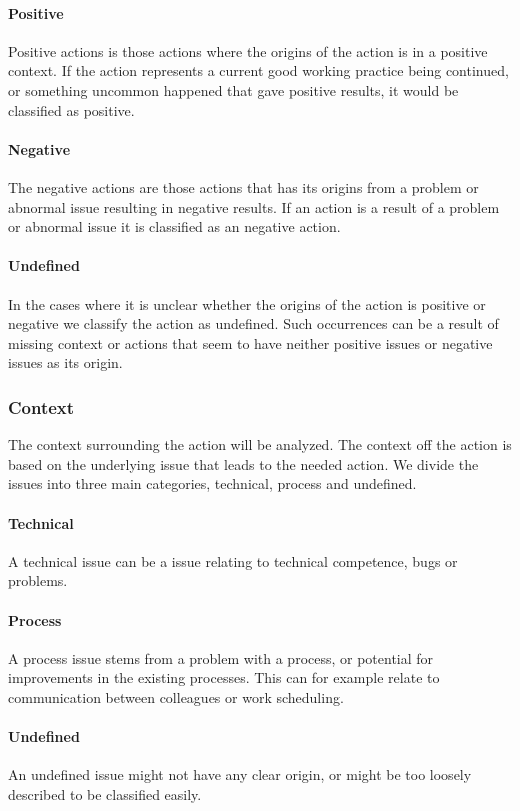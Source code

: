 \paragraph{Positive} Positive actions is those actions where the origins of the action is in a positive context. If the action represents a current good working practice being continued, or something uncommon happened that gave positive results, it would be classified as positive.
\paragraph{Negative} The negative actions are those actions that has its origins from a problem or abnormal issue resulting in negative results. If an action is a result of a problem or abnormal issue it is classified as an negative action. 
\paragraph{Undefined} In the cases where it is unclear whether the origins of the action is positive or negative we classify the action as undefined. Such occurrences can be a result of missing context or actions that seem to have neither positive issues or negative issues as its origin. 
\subsubsection{Context}	
The context surrounding the action will be analyzed. The context off the action is based on the underlying issue that leads to the needed action. We divide the issues into three main categories, technical, process and undefined. 
\paragraph{Technical}
A technical issue can be a issue relating to technical competence, bugs or problems.
\paragraph{Process}
A process issue stems from a problem with a process, or potential for improvements in the existing processes. This can for example relate to communication between colleagues or work scheduling.
\paragraph{Undefined}
 An undefined issue might not have any clear origin, or might be too loosely described to be classified easily.
